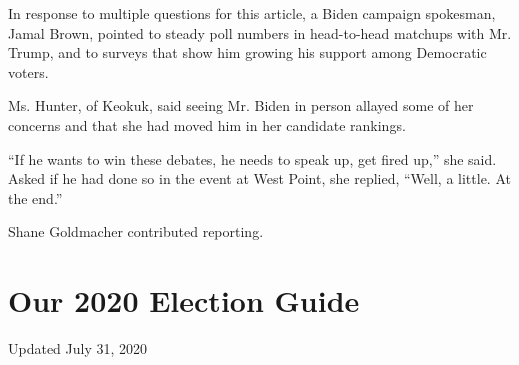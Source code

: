 In response to multiple questions for this article, a Biden campaign
spokesman, Jamal Brown, pointed to steady poll numbers in head-to-head
matchups with Mr. Trump, and to surveys that show him growing his
support among Democratic voters.

Ms. Hunter, of Keokuk, said seeing Mr. Biden in person allayed some of
her concerns and that she had moved him in her candidate rankings.

``If he wants to win these debates, he needs to speak up, get fired
up,'' she said. Asked if he had done so in the event at West Point, she
replied, ``Well, a little. At the end.''

Shane Goldmacher contributed reporting.

\hypertarget{our-2020-election-guide}{%
\section{Our 2020 Election Guide}\label{our-2020-election-guide}}

Updated July 31, 2020

